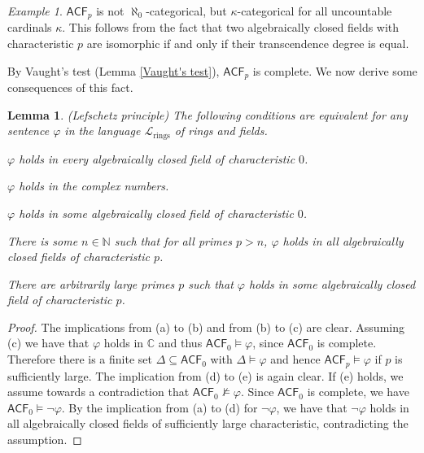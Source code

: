 \documentclass[a4paper, 11pt]{amsart}
\newtheorem{lemma}[lemma]{Lemma}
\theoremstyle{remark}
\newtheorem{example}[example]{Example}
\newcommand{\CC}{\mathbb C}
\newcommand{\cL}{\mathcal L}
\newenvironment{enumerate-(a)}{\begin{enumerate}[label={\upshape (\alph*)}, leftmargin=2pc]}{\end{enumerate}}
\begin{document}

\begin{example} 
$\mathsf{ACF}_p$ is not $\aleph_0$-categorical, but $\kappa$-categorical for all uncountable cardinals $\kappa$. This follows from the fact that two algebraically closed fields with characteristic $p$ are isomorphic if and only if their transcendence degree is equal. 
\end{example} 

By Vaught's test (Lemma \ref{Vaught's test}), $\mathsf{ACF}_p$ is complete. We now derive some consequences of this fact. 

\begin{lemma} \label{Lefschetz principle} (Lefschetz principle) 
The following conditions are equivalent for any sentence $\varphi$ in the language $\cL_{\mathrm{rings}}$ of rings and fields. 
\begin{enumerate-(a)} 
\item 
$\varphi$ holds in every algebraically closed field of characteristic $0$. 
\item 
$\varphi$ holds in the complex numbers. 
\item 
$\varphi$ holds in some algebraically closed field of characteristic $0$. 
\item 
There is some $n\in\mathbb{N}$ such that for all primes $p>n$, $\varphi$ holds in all algebraically closed fields of characteristic $p$. 
\item 
There are arbitrarily large primes $p$ such that $\varphi$ holds in some algebraically closed field of characteristic $p$. 
\end{enumerate-(a)} 
\end{lemma} 
\begin{proof} 
The implications from (a) to (b) and from (b) to (c) are clear. Assuming (c) we have that $\varphi$ holds in $\CC$ and thus $\mathsf{ACF}_0\models \varphi$, since $\mathsf{ACF}_0$ is complete. Therefore there is a finite set $\Delta\subseteq \mathsf{ACF}_0$ with $\Delta \models \varphi$ and hence $\mathsf{ACF}_p\models \varphi$ if $p$ is sufficiently large. 
The implication from (d) to (e) is again clear. 
If (e) holds, we assume towards a contradiction that $\mathsf{ACF}_0\not\models \varphi$. Since $\mathsf{ACF}_0$ is complete, we have $\mathsf{ACF}_0\models \neg\varphi$. By the implication from (a) to (d) for $\neg\varphi$, we have that $\neg\varphi$ holds in all algebraically closed fields of sufficiently large characteristic, contradicting the assumption. 
\end{proof} 
\end{document}
